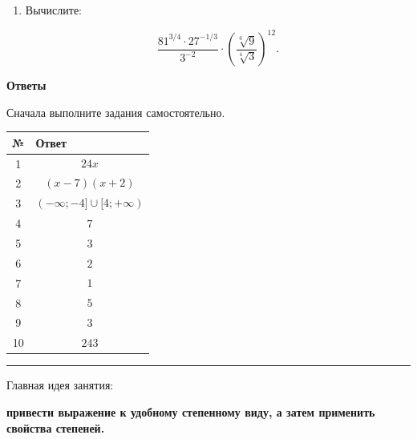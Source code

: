 \documentclass[a4paper,12pt]{article}
\begin{document}
\begin{enumerate}[label=\textbf{\arabic*.},start=10]

\item
Вычислите:

\[
\frac{
81^{3/4}\cdot27^{-1/3}
}{
3^{-2}
}
\cdot
\left(
\frac{
\sqrt[6]{9}
}{
\sqrt[4]{3}
}
\right)^{12}.
\]

\end{enumerate}


\clearpage

\begin{center}

{\LARGE\bfseries\color{darkaccent}
Ответы
}

\vspace{0.4cm}

{\small\color{softgray}
Сначала выполните задания самостоятельно.
}

\end{center}

\vspace{0.8cm}

\renewcommand{\arraystretch}{1.45}

\begin{center}
\begin{tabularx}{\linewidth}{@{}cY@{}}
\toprule
\textbf{№} & \textbf{Ответ} \\
\midrule

1 &
\[
24x
\]
\\

2 &
\[
(x-7)(x+2)
\]
\\

3 &
\[
(-\infty;-4]\cup[4;+\infty)
\]
\\

4 &
\[
7
\]
\\

5 &
\[
3
\]
\\

6 &
\[
2
\]
\\

7 &
\[
1
\]
\\

8 &
\[
5
\]
\\

9 &
\[
3
\]
\\

10 &
\[
243
\]
\\

\bottomrule
\end{tabularx}
\end{center}

\vfill

\begin{center}
{\color{accent}\rule{0.72\linewidth}{0.5pt}}

\vspace{0.45cm}

{\small\color{softgray}
Главная идея занятия:
}

\vspace{0.2cm}

{\large\bfseries\color{darkaccent}
привести выражение к удобному степенному виду,
а затем применить свойства степеней.
}

\end{center}
\end{document}
